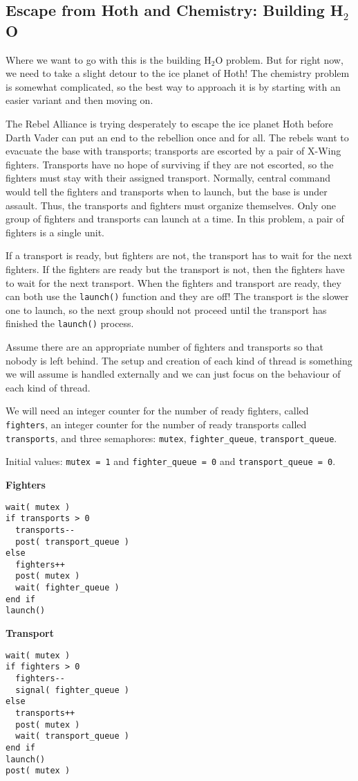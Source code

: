 \subsection*{Escape from Hoth and Chemistry: Building H$_{2}$O}
Where we want to go with this is the building H$_{2}$O problem. But for right now, we need to take a slight detour to the ice planet of Hoth! The chemistry problem is somewhat complicated, so the best way to approach it is by starting with an easier variant and then moving on.

The Rebel Alliance is trying desperately to escape the ice planet Hoth before Darth Vader can put an end to the rebellion once and for all. The rebels want to evacuate the base with transports; transports are escorted by a pair of X-Wing fighters. Transports have no hope of surviving if they are not escorted, so the fighters must stay with their assigned transport. Normally, central command would tell the fighters and transports when to launch, but the base is under assault. Thus, the transports and fighters must organize themselves. Only one group of fighters and transports can launch at a time. In this problem,  a pair of fighters is a single unit.

If a transport is ready, but fighters are not, the transport has to wait for the next fighters. If the fighters are ready but the transport is not, then the fighters have to wait for the next transport. When the fighters and transport are ready, they can both use the \texttt{launch()} function and they are off! The transport is the slower one to launch, so the next group should not proceed until the transport has finished the \texttt{launch()} process.

Assume there are an appropriate number of fighters and transports so that nobody is left behind. The setup and creation of each kind of thread is something we will assume is handled externally and we can just focus on the behaviour of each kind of thread.

We will need an integer counter for the number of ready fighters, called \texttt{fighters}, an integer counter for the number of ready transports called \texttt{transports}, and three semaphores: \texttt{mutex}, \texttt{fighter\_queue}, \texttt{transport\_queue}.


Initial values: \texttt{mutex = 1} and \texttt{fighter\_queue = 0} and \texttt{transport\_queue = 0}.

\begin{multicols}{2}
\textbf{Fighters}\vspace{-2em}
\begin{verbatim}
wait( mutex )
if transports > 0
  transports--
  post( transport_queue )
else 
  fighters++
  post( mutex )
  wait( fighter_queue )
end if  
launch()
\end{verbatim}
\columnbreak

\textbf{Transport}\vspace{-1em}
\begin{verbatim}
wait( mutex )
if fighters > 0
  fighters--
  signal( fighter_queue )
else
  transports++
  post( mutex )
  wait( transport_queue )
end if
launch()
post( mutex )
\end{verbatim}
\end{multicols}

